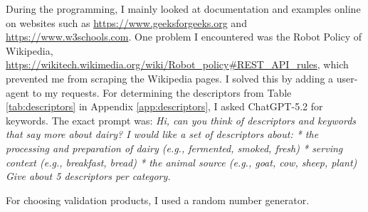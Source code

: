 \documentclass[sigconf]{acmart-txmm}
\begin{document}
During the programming, I mainly looked at documentation and examples online on websites such as \url{https://www.geeksforgeeks.org} and \url{https://www.w3schools.com}.
One problem I encountered was the Robot Policy of Wikipedia, \url{https://wikitech.wikimedia.org/wiki/Robot_policy#REST_API_rules}, which prevented me from scraping the Wikipedia pages.
I solved this by adding a user-agent to my requests.
For determining the descriptors from Table \ref{tab:descriptors} in Appendix \ref{app:descriptors}, I asked ChatGPT-5.2 for keywords.
The exact prompt was: \textit{Hi, can you think of descriptors and keywords that say more about dairy? I would like a set of descriptors about: * the processing and preparation of dairy (e.g., fermented, smoked, fresh) * serving context (e.g., breakfast, bread) * the animal source (e.g., goat, cow, sheep, plant) Give about 5 descriptors per category.}

For choosing validation products, I used a random number generator.

\newpage
\end{document}
